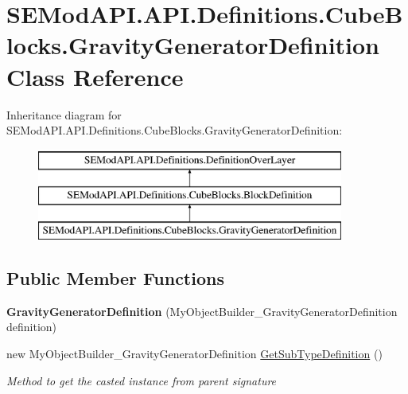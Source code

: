 \hypertarget{class_s_e_mod_a_p_i_1_1_a_p_i_1_1_definitions_1_1_cube_blocks_1_1_gravity_generator_definition}{}\section{S\+E\+Mod\+A\+P\+I.\+A\+P\+I.\+Definitions.\+Cube\+Blocks.\+Gravity\+Generator\+Definition Class Reference}
\label{class_s_e_mod_a_p_i_1_1_a_p_i_1_1_definitions_1_1_cube_blocks_1_1_gravity_generator_definition}
Inheritance diagram for S\+E\+Mod\+A\+P\+I.\+A\+P\+I.\+Definitions.\+Cube\+Blocks.\+Gravity\+Generator\+Definition\+:\begin{figure}[H]
\begin{center}
\leavevmode
\includegraphics[height=3.000000cm]{class_s_e_mod_a_p_i_1_1_a_p_i_1_1_definitions_1_1_cube_blocks_1_1_gravity_generator_definition}
\end{center}
\end{figure}
\subsection*{Public Member Functions}
\begin{DoxyCompactItemize}
\item 
\hypertarget{class_s_e_mod_a_p_i_1_1_a_p_i_1_1_definitions_1_1_cube_blocks_1_1_gravity_generator_definition_a228679d6521fe1662c4e0e4e8164cb84}{}{\bfseries Gravity\+Generator\+Definition} (My\+Object\+Builder\+\_\+\+Gravity\+Generator\+Definition definition)\label{class_s_e_mod_a_p_i_1_1_a_p_i_1_1_definitions_1_1_cube_blocks_1_1_gravity_generator_definition_a228679d6521fe1662c4e0e4e8164cb84}

\item 
new My\+Object\+Builder\+\_\+\+Gravity\+Generator\+Definition \hyperlink{class_s_e_mod_a_p_i_1_1_a_p_i_1_1_definitions_1_1_cube_blocks_1_1_gravity_generator_definition_a12057226a3fa7533aa404b26befb7c74}{Get\+Sub\+Type\+Definition} ()
\begin{DoxyCompactList}\small\item\em Method to get the casted instance from parent signature \end{DoxyCompactList}\end{DoxyCompactItemize}
